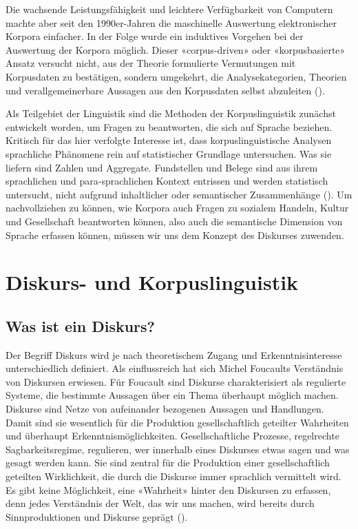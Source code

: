 Die wachsende Leistungsfähigkeit und leichtere Verfügbarkeit von Computern machte aber seit den 1990er-Jahren die maschinelle Auswertung elektronischer Korpora einfacher. In der Folge wurde ein induktives Vorgehen bei der Auswertung der Korpora möglich. Dieser «corpus-driven» oder «korpusbasierte» Ansatz versucht nicht, aus der Theorie formulierte Vermutungen mit Korpusdaten zu bestätigen, sondern umgekehrt, die Analysekategorien, Theorien und verallgemeinerbare Aussagen aus den Korpusdaten selbst abzuleiten (\cite[65]{tognini-bonelli_corpus_2001}).

Als Teilgebiet der Linguistik sind die Methoden der Korpuslinguistik zunächst entwickelt worden, um Fragen zu beantworten, die sich auf Sprache beziehen. Kritisch für das hier verfolgte Interesse ist, dass korpuslinguistische Analysen sprachliche Phänomene rein auf statistischer Grundlage untersuchen. Was sie liefern sind Zahlen und Aggregate. Fundstellen und Belege sind aus ihrem sprachlichen und para-sprachlichen Kontext entrissen und werden statistisch untersucht, nicht aufgrund inhaltlicher oder semantischer Zusammenhänge (\cite[61-62]{kupietz_korpuslinguistik_2018}). Um nachvollziehen zu können, wie Korpora auch Fragen zu sozialem Handeln, Kultur und Gesellschaft beantworten können, also auch die semantische Dimension von Sprache erfassen können, müssen wir uns dem Konzept des Diskurses zuwenden.

\section{Diskurs- und Korpuslinguistik}

\subsection{Was ist ein Diskurs?}

Der Begriff Diskurs wird je nach theoretischem Zugang und Erkenntnisinteresse unterschiedlich definiert. Als einflussreich hat sich Michel Foucaults Verständnis von Diskursen erwiesen. Für Foucault sind Diskurse charakterisiert als regulierte Systeme, die bestimmte Aussagen über ein Thema überhaupt möglich machen. Diskurse sind Netze von aufeinander bezogenen Aussagen und Handlungen. Damit sind sie wesentlich für die Produktion gesellschaftlich geteilter Wahrheiten und überhaupt Erkenntnismöglichkeiten. Gesellschaftliche Prozesse, regelrechte Sagbarkeitsregime, regulieren, wer innerhalb eines Diskurses etwas sagen und was gesagt werden kann. Sie sind zentral für die Produktion einer gesellschaftlich geteilten Wirklichkeit, die durch die Diskurse immer sprachlich vermittelt wird. Es gibt keine Möglichkeit, eine «Wahrheit» hinter den Diskursen zu erfassen, denn jedes Verständnis der Welt, das wir uns machen, wird bereits durch Sinnproduktionen und Diskurse geprägt (\cite{foucault_ordnung_2021}).

